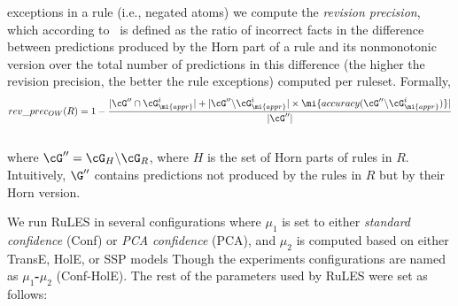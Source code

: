 exceptions in a rule (i.e., negated atoms) we compute %
the \textit{revision precision}, which according to~\cite{trantowards} is defined as the ratio of incorrect %
facts in the difference between predictions produced by the Horn part of a rule and its nonmonotonic version over %
the total number of predictions in this difference (the higher the revision precision, the better the rule exceptions) computed per ruleset. Formally,
\[rev\_prec_{OW}(R) = 1-\frac{|\cG'' \cap \cG^i_{\mi{appr}}|+|\cG''\backslash \cG^i_{\mi{appr}}|\times \mi{accuracy(\cG''\backslash \cG^i_{\mi{appr}})}|}{|\cG''|}\]\\
where $\cG''=\cG_H\backslash \cG_R$, where $H$ is the set of Horn parts of rules in $R$. 
Intuitively, $\G''$ contains predictions not produced by the rules in $R$ but by their Horn version. 

 
 

We run RuLES in several configurations where $\mu_1$ is set to either \textit{standard confidence} (Conf) or \textit{PCA confidence} (PCA), and $\mu_2$ is computed based on either TransE, HolE, or SSP models %
Though the experiments configurations are named as \textbf{$\mu_1$-$\mu_2$} (\eg Conf-HolE).
The rest of the parameters used by RuLES were set as follows: 



